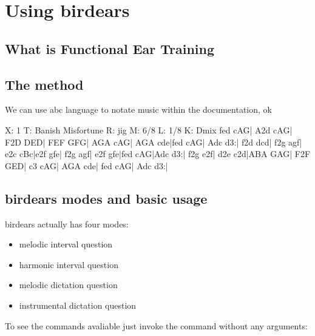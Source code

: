 \documentclass[letterpaper,10pt,english]{sphinxmanual}
\begin{document}
\chapter{Using birdears}
\label{\detokenize{using:using-birdears}}\label{\detokenize{using::doc}}

\section{What is Functional Ear Training}
\label{\detokenize{using:what-is-functional-ear-training}}
\sphinxAtStartPar
{}


\section{The method}
\label{\detokenize{using:the-method}}
\sphinxAtStartPar
We can use abc language to notate music within the documentation, ok

\begin{sphinxVerbatim}[commandchars=\\\{\}]
X: 1
T: Banish Misfortune
R: jig
M: 6/8
L: 1/8
K: Dmix
fed cAG| A2d cAG| F2D DED| FEF GFG|
AGA cAG| AGA cde|fed cAG| Ad\PYGZca{}c d3:|
f2d d\PYGZca{}cd| f2g agf| e2c cBc|e2f gfe|
f2g agf| e2f gfe|fed cAG|Ad\PYGZca{}c d3:|
f2g e2f| d2e c2d|ABA GAG| F2F GED|
c3 cAG| AGA cde| fed cAG| Ad\PYGZca{}c d3:|
\end{sphinxVerbatim}


\section{birdears modes and basic usage}
\label{\detokenize{using:birdears-modes-and-basic-usage}}
\sphinxAtStartPar
birdears actually has four modes:
\begin{itemize}
\item {} 
\sphinxAtStartPar
melodic interval question

\item {} 
\sphinxAtStartPar
harmonic interval question

\item {} 
\sphinxAtStartPar
melodic dictation question

\item {} 
\sphinxAtStartPar
instrumental dictation question

\end{itemize}

\sphinxAtStartPar
To see the commands avaliable just invoke the command without any arguments:
\end{document}
